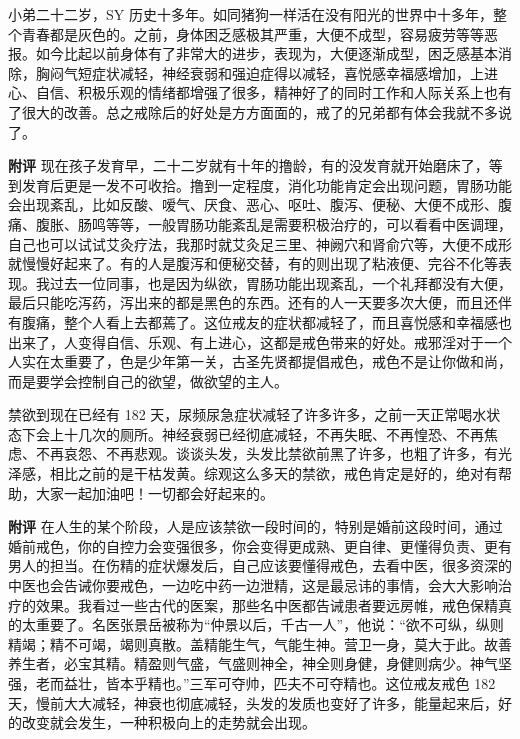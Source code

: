 \begin{case}[神经衰弱]
    小弟二十二岁，SY 历史十多年。如同猪狗一样活在没有阳光的世界中十多年，整个青春都是灰色的。之前，身体困乏感极其严重，大便不成型，容易疲劳等等恶报。如今比起以前身体有了非常大的进步，表现为，大便逐渐成型，困乏感基本消除，胸闷气短症状减轻，神经衰弱和强迫症得以减轻，喜悦感幸福感增加，上进心、自信、积极乐观的情绪都增强了很多，精神好了的同时工作和人际关系上也有了很大的改善。总之戒除后的好处是方方面面的，戒了的兄弟都有体会我就不多说了。

    \textbf{附评} 现在孩子发育早，二十二岁就有十年的撸龄，有的没发育就开始磨床了，等到发育后更是一发不可收拾。撸到一定程度，消化功能肯定会出现问题，胃肠功能会出现紊乱，比如反酸、嗳气、厌食、恶心、呕吐、腹泻、便秘、大便不成形、腹痛、腹胀、肠鸣等等，一般胃肠功能紊乱是需要积极治疗的，可以看看中医调理，自己也可以试试艾灸疗法，我那时就艾灸足三里、神阙穴和肾俞穴等，大便不成形就慢慢好起来了。有的人是腹泻和便秘交替，有的则出现了粘液便、完谷不化等表现。我过去一位同事，也是因为纵欲，胃肠功能出现紊乱，一个礼拜都没有大便，最后只能吃泻药，泻出来的都是黑色的东西。还有的人一天要多次大便，而且还伴有腹痛，整个人看上去都蔫了。这位戒友的症状都减轻了，而且喜悦感和幸福感也出来了，人变得自信、乐观、有上进心，这都是戒色带来的好处。戒邪淫对于一个人实在太重要了，色是少年第一关，古圣先贤都提倡戒色，戒色不是让你做和尚，而是要学会控制自己的欲望，做欲望的主人。
\end{case}

\begin{case}[神经衰弱]
    禁欲到现在已经有 182 天，尿频尿急症状减轻了许多许多，之前一天正常喝水状态下会上十几次的厕所。神经衰弱已经彻底减轻，不再失眠、不再惶恐、不再焦虑、不再哀怨、不再悲观。谈谈头发，头发比禁欲前黑了许多，也粗了许多，有光泽感，相比之前的是干枯发黄。综观这么多天的禁欲，戒色肯定是好的，绝对有帮助，大家一起加油吧！一切都会好起来的。

    \textbf{附评} 在人生的某个阶段，人是应该禁欲一段时间的，特别是婚前这段时间，通过婚前戒色，你的自控力会变强很多，你会变得更成熟、更自律、更懂得负责、更有男人的担当。在伤精的症状爆发后，自己应该要懂得戒色，去看中医，很多资深的中医也会告诫你要戒色，一边吃中药一边泄精，这是最忌讳的事情，会大大影响治疗的效果。我看过一些古代的医案，那些名中医都告诫患者要远房帷，戒色保精真的太重要了。名医张景岳被称为“仲景以后，千古一人”，他说：“欲不可纵，纵则精竭；精不可竭，竭则真散。盖精能生气，气能生神。营卫一身，莫大于此。故善养生者，必宝其精。精盈则气盛，气盛则神全，神全则身健，身健则病少。神气坚强，老而益壮，皆本乎精也。”三军可夺帅，匹夫不可夺精也。这位戒友戒色 182 天，慢前大大减轻，神衰也彻底减轻，头发的发质也变好了许多，能量起来后，好的改变就会发生，一种积极向上的走势就会出现。
\end{case}

